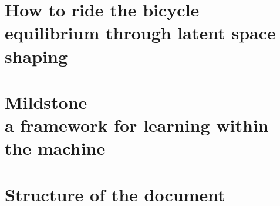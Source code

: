 

\section{How to ride the bicycle \\ \small{ equilibrium through latent space shaping }}
\cite{rideabike_nature_2016}


\section{Mildstone \\ \small{ a framework for learning within the machine }}

\section{Structure of the document}